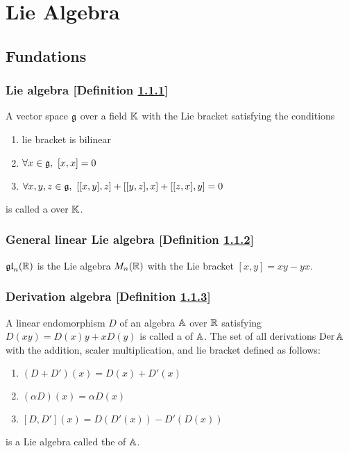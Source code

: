 \newcommand{\gl}{\g{gl}}
\renewcommand{\sl}{\g{sl}}
\renewcommand{\o}{\g{o}}
\section{Lie Algebra\cite{samu}}
\subsection{Fundations}
\subsubsection{Lie algebra [Definition \ref{lie-algebra}]}\label{lie-algebra}
A vector space $\mathfrak{g}$ over a field $\mathbb{K}$ with the Lie bracket satisfying the conditions
\begin{enumerate}
\item lie bracket is bilinear
\item $\forall x \in \mathfrak{g},\ [x,x] = 0$
\item $\forall x, y, z \in \g g,\ [[x,y],z]+[[y,z],x]+[[z,x],y] = 0$
\end{enumerate}
is called a  over $\mathbb{K}$.

\subsubsection{General linear Lie algebra [Definition \ref{general-linear-lie-algebra}]}\label{general-linear-lie-algebra}
$\mathfrak{gl}_n(\mathbb{R})$ is the Lie algebra $M_n(\mathbb{R})$ with the Lie bracket $[x,y] = xy - yx$.

\subsubsection{Derivation algebra [Definition \ref{derivation-algebra}]}\label{derivation-algebra}
A linear endomorphism $D$ of an algebra $\mathbb{A}$ over $\mathbb{R}$ satisfying $D(xy) = D(x)y + xD(y)$ is called a  of $\mathbb{A}$. The set of all derivations $\mathrm{Der}\, \mathbb{A}$ with the addition, scaler multiplication, and lie bracket defined as follows:
\begin{enumerate}
\item $(D+D')(x) = D(x)+D'(x)$
\item $(\alpha D)(x) = \alpha D(x)$
\item $[D,D'](x) = D(D'(x)) - D'(D(x))$
\end{enumerate}
is a Lie algebra called the  of $\mathbb{A}$.

